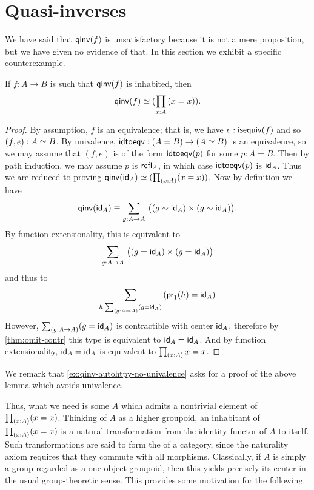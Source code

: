\section{Quasi-inverses}
\label{sec:quasi-inverses}

We have said that $\qinv(f)$ is unsatisfactory because it is not a mere proposition, but we have given no evidence of that.
In this section we exhibit a specific counterexample.

\begin{lem}\label{lem:qinv-autohtpy}
  If $f:A\to B$ is such that $\qinv (f)$ is inhabited, then
  \[\eqv{\qinv(f)}{(\prd{x:A}(x=x))}.\]
\end{lem}
\begin{proof}
  By assumption, $f$ is an equivalence; that is, we have $e:\isequiv(f)$ and so $(f,e):\eqv A B$.
  By univalence, $\idtoeqv:(A=B) \to (\eqv A B)$ is an equivalence, so we may assume that $(f,e)$ is of the form $\idtoeqv(p)$ for some $p:A=B$.
  Then by path induction, we may assume $p$ is $\refl{A}$, in which case $\idtoeqv(p)$ is $\idfunc[A]$.
  Thus we are reduced to proving $\eqv{\qinv(\idfunc[A])}{(\prd{x:A}(x=x))}$.
  Now by definition we have
  \[ \qinv(\idfunc[A]) \jdeq
  \sm{g:A\to A} \big((g \htpy \idfunc[A]) \times (g \htpy \idfunc[A])\big).
  \]
  By function extensionality, this is equivalent to
  \[ \sm{g:A\to A} \big((g = \idfunc[A]) \times (g = \idfunc[A])\big)
  \]
  and thus to
  \[ \sm{h:\sm{g:A\to A} (g = \idfunc[A])} (\proj1(h) = \idfunc[A])
  \]
  However, $\sm{g:A\to A} (g = \idfunc[A])$ is contractible with center $\idfunc[A]$, therefore by \autoref{thm:omit-contr} this type is equivalent to $\idfunc[A] = \idfunc[A]$.
  And by function extensionality, $\idfunc[A] = \idfunc[A]$ is equivalent to $\prd{x:A} x=x$.
\end{proof}

\noindent
We remark that \autoref{ex:qinv-autohtpy-no-univalence} asks for a proof of the above lemma which avoids univalence.

Thus, what we need is some $A$ which admits a nontrivial element of $\prd{x:A}(x=x)$.
Thinking of $A$ as a higher groupoid, an inhabitant of $\prd{x:A}(x=x)$ is a natural transformation from the identity functor of $A$ to itself.
Such transformations are said to form the  of a category, since the naturality axiom requires that they commute with all morphisms.
Classically, if $A$ is simply a group regarded as a one-object groupoid, then this yields precisely its center in the usual group-theoretic sense.
This provides some motivation for the following.

